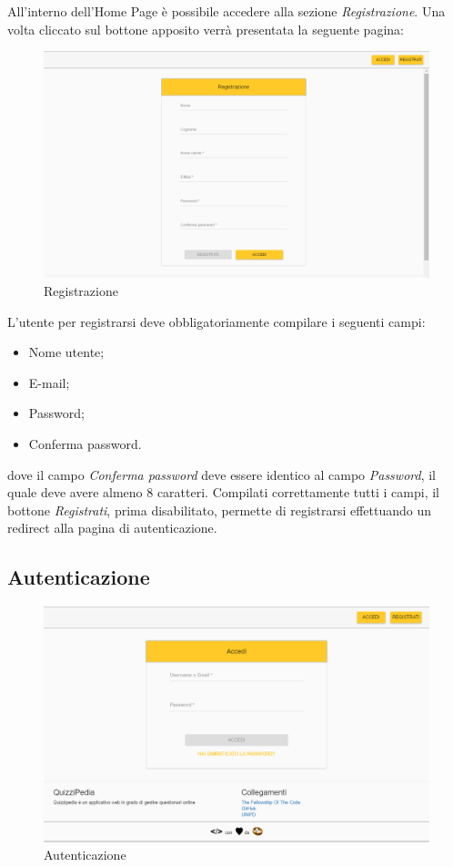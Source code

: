 All'interno dell'Home Page è possibile accedere alla sezione \textit{Registrazione}. Una volta cliccato sul bottone apposito verrà presentata la seguente pagina:

\label{Registrazione_1}
\begin{figure}[ht]
	\centering
	\includegraphics[scale=0.45]{img/registrazione.png}
	\caption{Registrazione}
\end{figure}
\FloatBarrier

L'utente per registrarsi deve obbligatoriamente compilare i seguenti campi:
\begin{itemize}
	\item Nome utente;
	\item E-mail;
	\item Password;
	\item Conferma password.
\end{itemize}
dove il campo \textit{Conferma password} deve essere identico al campo \textit{Password}, il quale deve avere almeno 8 caratteri. Compilati correttamente tutti i campi, il bottone \textit{Registrati}, prima disabilitato, permette di registrarsi effettuando un redirect alla pagina di autenticazione.  

\newpage
\subsection{Autenticazione}

\label{Autenticazione}
\begin{figure}[ht]
	\centering
	\includegraphics[scale=0.55]{img/autenticazione.png}
	\caption{Autenticazione}
\end{figure}
\FloatBarrier

